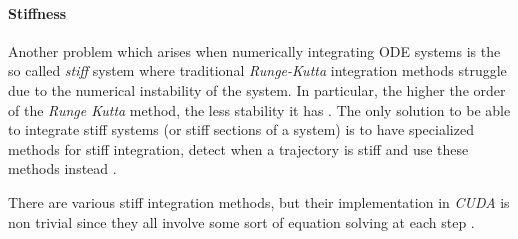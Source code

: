 \pagebreak
\paragraph{Stiffness} %
\label{sub:stiffness}

Another problem which arises when numerically integrating ODE systems is the so called \emph{stiff} system where traditional \emph{Runge-Kutta} integration methods struggle due to the numerical instability of the system. In particular, the higher the order of the \emph{Runge Kutta} method, the less stability it has \cite{skvortsov_accuracy_2003}. The only solution to be able to integrate stiff systems (or stiff sections of a system) is to have specialized methods for stiff integration, detect when a trajectory is stiff and use these methods instead
\cite{shampine_detecting_1977}.

There are various stiff integration methods, but their implementation in \emph{CUDA} is non trivial since they all involve some sort of equation solving
at each step \cite{butcher_numerical_2008}.
